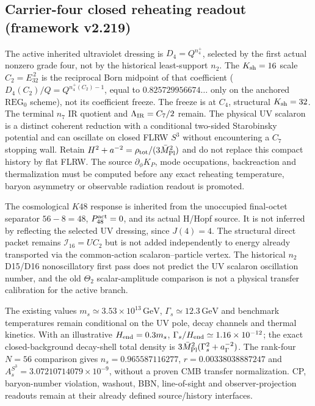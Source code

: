 \documentclass[12pt,a4paper]{article}
\begin{document}
\subsection{Carrier-four closed reheating readout (framework v2.219)}
\label{p9:sec:v2219-carrier4-import}
The active inherited ultraviolet dressing is $D_4=Q^{n_4^+}$,
selected by the first actual nonzero grade four, not by the historical
least-support $n_2$. The $K_{\rm sh}=16$ scale
$C_2=E_{32}^{\,2}$ is the reciprocal Born midpoint of that coefficient
($D_4(C_2)/Q=Q^{n_4^+(C_2)-1}$, equal to
$0.825729956674\ldots$ only on the anchored $\mathrm{REG}_0$
scheme), not its coefficient freeze.
The freeze is at $C_4$, structural $K_{\rm sh}=32$.
The terminal $n_7$ IR quotient and $\Lambda_{\rm IR}=C_7/2$ remain.
The physical UV scalaron is a distinct coherent reduction with a
conditional two-sided Starobinsky potential and can oscillate on closed
FLRW $S^3$ without encountering a $C_7$ stopping wall.  Retain
$H^2+a^{-2}=\rho_{\rm tot}/(3\bar M_{\rm Pl}^2)$ and do not replace
this compact history by flat FLRW.  The source $\partial_\phi K_P$,
mode occupations, backreaction and thermalization must be computed before
any exact reheating temperature, baryon asymmetry or observable radiation
readout is promoted.
\begin{proposition}
\label{paper6b:proposition:atlas-independent-k48-and-direct-packet-energy-ledge-0fe4260}%

The cosmological $K48$ response is inherited from the unoccupied
final-octet separator $56-8=48$, $P_{48}^{\rm act}=0$, and its actual
H/Hopf source.  It is not inferred by reflecting the selected UV dressing,
since $J(4)=4$.  The structural direct packet remains
$\mathcal I_{16}=UC_2$ but is not added independently to energy already
transported via the common-action scalaron--particle vertex.
The historical $n_2$ D15/D16 nonoscillatory first pass does not predict
the UV scalaron oscillation number, and the old $\Theta_2$ scalar-amplitude
comparison is not a physical transfer calibration for the active branch.
\end{proposition}
\begin{remark}
The existing values $m_s\simeq3.53\times10^{13}\,\mathrm{GeV}$,
$\Gamma_s\simeq12.3\,\mathrm{GeV}$ and benchmark temperatures
remain conditional on the UV pole, decay channels and thermal kinetics.
With an illustrative $H_{\rm end}=0.3m_s$,
$\Gamma_s/H_{\rm end}\simeq1.16\times10^{-12}$;
the exact closed-background decay-shell total density is
$3\bar M_{\rm Pl}^2(\Gamma_s^2+a_\Gamma^{-2})$.
The rank-four $N=56$ comparison gives
$n_s=0.965587116277$, $r=0.00338038887247$ and
$A_s^{S^3}=3.07210714079\times10^{-9}$, without a proven CMB
transfer normalization. CP, baryon-number violation, washout, BBN,
line-of-sight and observer-projection readouts remain at their already
defined source/history interfaces.
\end{remark}
\end{document}
